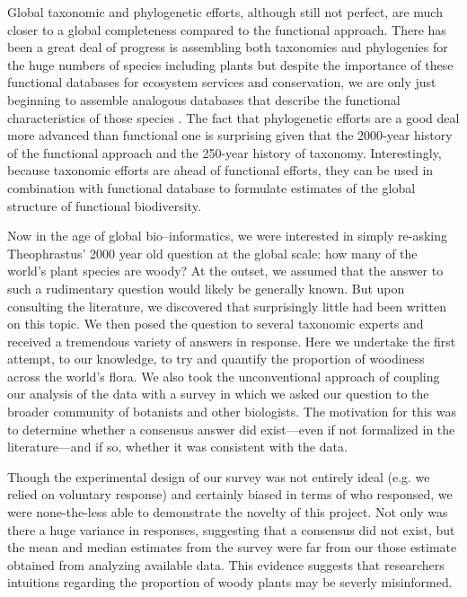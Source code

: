 \documentclass[12pt]{article}
\begin{document}
Global taxonomic and phylogenetic efforts, although still not perfect, are much closer to a global completeness compared to the functional approach.   There has been a great deal of progress is assembling both taxonomies and phylogenies for the huge numbers of species including plants \citep[e.g.][]{smith2011understanding} but despite the importance of these functional databases for ecosystem services and conservation, we are only just beginning to assemble analogous databases that describe the functional characteristics of those species \citep{Kattge2011TRY}.   The fact that phylogenetic efforts are a good deal more advanced than functional one is surprising given that the 2000-year history of the functional approach and the 250-year history of taxonomy.  Interestingly, because taxonomic efforts are ahead of functional efforts, they can be used in combination with functional database to formulate estimates of the global structure of functional biodiversity.

Now in the age of global bio--informatics, we were interested in simply re-asking Theophrastus' 2000 year old question at the global scale: how many of the world's plant species are woody? At the outset, we assumed that the answer to such a rudimentary question would likely be generally known. But upon consulting the literature, we discovered that surprisingly little had been written on this topic. We then posed the question to several taxonomic experts and received a tremendous variety of answers in response. Here we undertake the first attempt, to our knowledge, to try and quantify the proportion of woodiness across the world's flora. We also took the unconventional approach of coupling our analysis of the data with a survey in which we asked our question to the broader community of botanists and other biologists. The motivation for this was to determine whether a consensus answer did exist---even if not formalized in the literature---and if so, whether it was consistent with the data.

Though the experimental design of our survey was not entirely ideal (e.g. we relied on voluntary response) and certainly biased in terms of who responsed, we were none-the-less able to demonstrate the novelty of this project. Not only was there a huge variance in responses, suggesting that a consensus did not exist, but the mean and median estimates from the survey were far from our those estimate obtained from analyzing available data. This evidence suggests that researchers intuitions regarding the proportion of woody plants may be severly misinformed.
\end{document}
